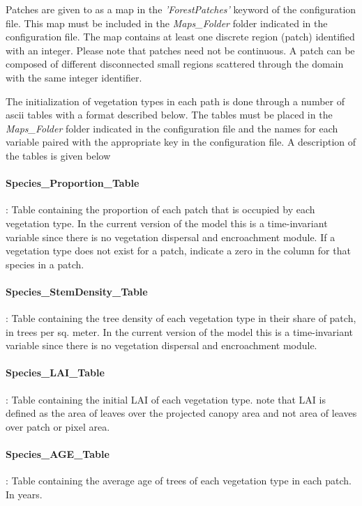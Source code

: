 Patches are given to \echo as a map in the \emph{'ForestPatches'} keyword of the configuration file. This map must be included in the \emph{Maps\_Folder} folder indicated in the configuration file. The map contains at least one discrete region (patch) identified with an integer. Please note that patches need not be continuous. A patch can be composed of different disconnected small regions scattered through the domain with the same integer identifier. 

The initialization of vegetation types in each path is done through a number of ascii tables with a format described below. The tables must be placed in the \emph{Maps\_Folder} folder indicated in the configuration file and the names for each variable paired with the appropriate key in the configuration file. A description of the tables is given below

\paragraph{Species\_Proportion\_Table}: Table containing the proportion of each patch that is occupied by each vegetation type. In the current version of the model this is a time-invariant variable since there is no vegetation dispersal and encroachment module. If a vegetation type does not exist for a patch, indicate a zero in the column for that species in a patch.

\paragraph{Species\_StemDensity\_Table }: Table containing the tree density of each vegetation type in their share of patch, in trees per sq. meter. In the current version of the model this is a time-invariant variable since there is no vegetation dispersal and encroachment module.

\paragraph{Species\_LAI\_Table  }: Table containing the initial LAI of each vegetation type. note that LAI is defined as the area of leaves over the projected canopy area and not area of leaves over patch or pixel area. 

\paragraph{Species\_AGE\_Table  }: Table containing the average age of trees of each vegetation type in each patch. In years. 

